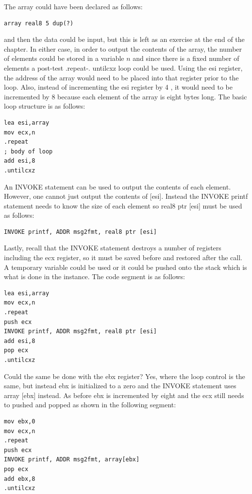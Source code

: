 \documentclass[10pt]{book}
\begin{document}
The array could have been declared as follows:

\begin{verbatim}
array real8 5 dup(?)
\end{verbatim}

and then the data could be input, but this is left as an exercise at the end of the chapter. In either case, in order to output the contents of the array, the number of elements could be stored in a variable $n$ and since there is a fixed number of elements a post-test .repeat-. untilcxz loop could be used. Using the esi register, the address of the array would need to be placed into that register prior to the loop. Also, instead of incrementing the esi register by 4 , it would need to be incremented by 8 because each element of the array is eight bytes long. The basic loop structure is as follows:

\begin{verbatim}
lea esi,array
mov ecx,n
.repeat
; body of loop
add esi,8
.untilcxz
\end{verbatim}

An INVOKE statement can be used to output the contents of each element. However, one cannot just output the contents of [esi]. Instead the INVOKE printf statement needs to know the size of each element so real8 ptr [esi] must be used as follows:

\begin{verbatim}
INVOKE printf, ADDR msg2fmt, real8 ptr [esi]
\end{verbatim}

Lastly, recall that the INVOKE statement destroys a number of registers including the ecx register, so it must be saved before and restored after the call. A temporary variable could be used or it could be pushed onto the stack which is what is done in the instance. The code segment is as follows:

\begin{verbatim}
lea esi,array
mov ecx,n
.repeat
push ecx
INVOKE printf, ADDR msg2fmt, real8 ptr [esi]
add esi,8
pop ecx
.untilcxz
\end{verbatim}

Could the same be done with the ebx register? Yes, where the loop control is the same, but instead ebx is initialized to a zero and the INVOKE statement uses array [ebx] instead. As before ebx is incremented by eight and the ecx still needs to pushed and popped as shown in the following segment:

\begin{verbatim}
mov ebx,0
mov ecx,n
.repeat
push ecx
INVOKE printf, ADDR msg2fmt, array[ebx]
pop ecx
add ebx,8
.untilcxz
\end{verbatim}
\end{document}
